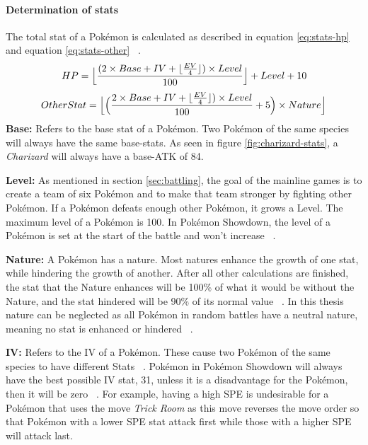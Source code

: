 \paragraph{Determination of stats}
\label{sec:stat-calculation}
The total stat of a Pokémon is calculated as described in equation \ref{eq:stats-hp} and equation 
\ref{eq:stats-other} ~\autocite{Bulbapedia:Stat}.
\begin{equation}
	\label{eq:stats-hp}
	HP = \Bigl\lfloor \frac{(2 \times Base + IV + \lfloor \frac{EV}{4} \rfloor) \times Level}{100}\Bigr\rfloor
	+ Level + 10 \\
\end{equation}
\begin{equation}
	\label{eq:stats-other}
	OtherStat = \Bigl\lfloor \Big( \frac{2 \times Base + IV + \lfloor \frac{EV}{4} \rfloor) \times Level}
	{100} + 5\Big) \times Nature \Bigr\rfloor
\end{equation}
\textbf{Base:} Refers to the base stat of a Pokémon. Two Pokémon of the same species will always have the 
same base-stats. As seen in figure \ref{fig:charizard-stats}, a \textit{Charizard} will always have a
base-\ac{ATK} of 84.

\textbf{Level:} As mentioned in section \ref{sec:battling}, the goal of the mainline games is to create 
a team of six Pokémon and to make that team stronger by fighting other Pokémon. If a Pokémon defeats
enough other Pokémon, it grows a Level. The maximum level of a Pokémon is 100.
In Pokémon Showdown, the level of  a Pokémon is set at the start of the battle and won't 
increase ~\autocite{Smogon:RandBatsGuide}.

\textbf{Nature:} A Pokémon has a nature. Most natures enhance the growth of one stat, while hindering
the growth of another. After all other calculations are finished, the stat that the Nature enhances will
be 100\% of what it would be without the Nature, and the stat hindered will be 90\% of its normal value
~\autocite{Bulbapedia:Stat}. In this thesis nature can be neglected as all Pokémon in random battles have
a neutral nature, meaning no stat is enhanced or hindered ~\autocite{Smogon:RandBatsGuide}.

\textbf{IV:} Refers to the \ac{IV} of a Pokémon. These cause two Pokémon of the same species to have
different Stats ~\autocite{Bulbapedia:Stat}. Pokémon in Pokémon Showdown will always have the best possible \ac{IV} 
stat, 31, unless it is a disadvantage for the Pokémon, then it will be zero ~\autocite{Smogon:RandBatsGuide}.
For example, having a high \ac{SPE} is undesirable for a Pokémon that uses the move \textit{Trick Room} as this
move reverses the move order so that Pokémon with a lower \ac{SPE} stat attack first while those with a 
higher \ac{SPE} will attack last.

